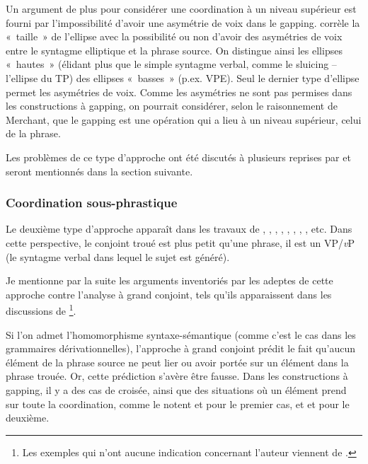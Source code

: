 Un argument de plus pour considérer une coordination à un niveau supérieur est fourni par l’impossibilité d’avoir une asymétrie de voix dans le gapping. \citet{Merchant2008a,Merchant2008b} corrèle la «~taille~» de l’ellipse avec la possibilité ou non d’avoir des asymétries de voix entre le syntagme elliptique et la phrase source. On distingue ainsi les ellipses «~hautes~» (élidant plus que le simple syntagme verbal, comme le sluicing – l’ellipse du TP) des ellipses «~basses~» (p.ex. VPE). Seul le dernier type d’ellipse permet les asymétries de voix. Comme les asymétries ne sont pas permises dans les constructions à gapping, on pourrait considérer, selon le raisonnement de Merchant, que le gapping est une opération qui a lieu à un niveau supérieur, {\cad} celui de la phrase.

Les problèmes de ce type d’approche ont été discutés à plusieurs reprises par \citet{Johnson1996/2004,Johnson2000,Johnson2009} et seront mentionnés dans la section suivante. 


\subsubsection{Coordination sous-phrastique} \label{ch2:sect2.4.1.2}

Le deuxième type d’approche apparaît dans les travaux de \citet{Siegel1984,Siegel1987}, \citet{Johnson1996/2004,Johnson2000,Johnson2008,Johnson2009}, \citet{Coppock2001}, \citet{Lin2002}, \citet{LopezEtAl2003}, \citet{Winkler2005}, \citet{Hulsey2008}, \citet{Agafonova2014}, etc. Dans cette perspective, le conjoint troué est plus petit qu’une phrase, {\cad} il est un VP/\textit{v}P (le syntagme verbal dans lequel le sujet est généré). 

Je mentionne par la suite les arguments inventoriés par les adeptes de cette approche contre l’analyse à grand conjoint, tels qu’ils apparaissent dans les discussions de \citet{Johnson1996/2004,Johnson2000,Johnson2009}\footnote{
 Les exemples qui n’ont aucune indication concernant l’auteur viennent de \citet{Johnson2000,Johnson2009}.}. 

Si l’on admet l’homomorphisme syntaxe-sémantique (comme c’est le cas dans les grammaires dérivationnelles), l’approche à grand conjoint prédit le fait qu’aucun élément de la phrase source ne peut lier ou avoir portée sur un élément dans la phrase trouée. Or, cette prédiction s’avère être fausse. Dans les constructions à gapping, il y a des cas de  croisée, ainsi que des situations où un élément prend  sur toute la coordination, comme le notent \citet{Oehrle1987} et \citet{McCawley1993} pour le premier cas, et \citet{Siegel1984,Siegel1987} et \citet{Oehrle1987} pour le deuxième. 

